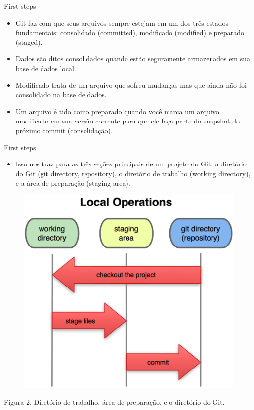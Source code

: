 \documentclass[t]{beamer}
\begin{document}
\begin{frame} {First steps}
	\begin{itemize}
		\item Git faz com que seus arquivos sempre estejam em um dos três estados fundamentais: consolidado (committed), modificado (modified) e preparado (staged). 
		\item Dados são ditos consolidados quando estão seguramente armazenados em sua base de dados local. 
		\item Modificado trata de um arquivo que sofreu mudanças mas que ainda não foi consolidado na base de dados.
		\item Um arquivo é tido como preparado quando você marca um arquivo modificado em sua versão corrente para que ele faça parte do snapshot do próximo commit (consolidação).
	\end{itemize}
\end{frame}	

\begin{frame} {First steps}
	\begin{itemize}
		\item Isso nos traz para as três seções principais de um projeto do Git: o diretório do Git (git directory, repository), o diretório de trabalho (working directory), e a área de preparação (staging area).
	\end{itemize}

  		\begin{figure}[tb!]
  			\centering
  			\includegraphics[scale=0.2,keepaspectratio=true]{diretorio.png}
  		\end{figure}
	Figura 2. Diretório de trabalho, área de preparação, e o diretório do Git.
	
	
\end{frame}	
\end{document}

